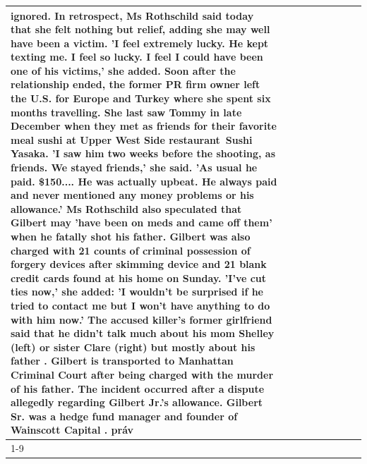 \begin{table}[H]
\begin{tabular}{lllrlllll}
ignored. In retrospect, Ms Rothschild said today that she felt nothing but relief, adding she may well have been a victim. 'I feel extremely lucky. He kept texting me. I feel so lucky. I feel I could have been one of his victims,' she added. Soon after the relationship ended, the former PR firm owner left the U.S. for Europe and Turkey where she spent six months  travelling. She last saw Tommy in late December when they met as friends for their favorite meal sushi at Upper West Side restaurant Sushi Yasaka. 'I saw him two weeks before the shooting, as friends. We stayed friends,' she said. 'As usual he paid. \$150.... He was actually upbeat. He always paid and never mentioned any money problems or his allowance.' Ms Rothschild also speculated that Gilbert may 'have been on meds and came off them' when he fatally shot his father. Gilbert was also charged with 21 counts of criminal possession of forgery devices after skimming device and 21 blank credit cards found at his home on Sunday. 'I've cut ties now,' she added: 'I wouldn’t be surprised if he tried to contact me but I won’t have anything to do with him now.' The accused killer's former girlfriend said that he didn't talk much about his mom Shelley (left) or sister Clare (right) but mostly about his father . Gilbert is transported to Manhattan Criminal Court  after being charged with the murder of his father. The incident occurred after a dispute allegedly regarding Gilbert Jr.'s allowance. Gilbert Sr. was a hedge fund manager and founder of Wainscott Capital . práv \\
\cline{1-9}

\end{tabular}
\end{table}
